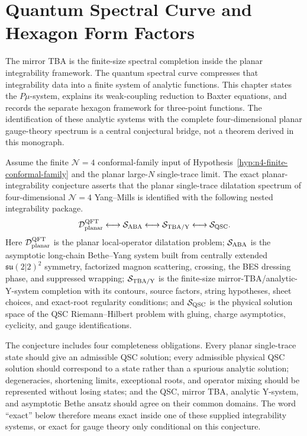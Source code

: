 \chapter{Quantum Spectral Curve and Hexagon Form Factors}
\label{ch:planar-n4-quantum-spectral-curve-hexagon}

\ConventionsLorentzian

The mirror TBA is the finite-size spectral completion inside the planar
integrability framework.  The quantum spectral curve compresses that
integrability data into a finite system of analytic functions.  This chapter
states the \(P\mu\)-system, explains its weak-coupling reduction to Baxter
equations, and records the separate hexagon framework for three-point
functions.  The identification of these analytic systems with the complete
four-dimensional planar gauge-theory spectrum is a central conjectural bridge,
not a theorem derived in this monograph.

\begin{conjecture}[Central conjecture: exact planar \(\mathcal N=4\) integrability]
\label{conj:planar-n4-exact-integrability}
Assume the finite \(\mathcal N=4\) conformal-family input of
Hypothesis~\ref{hyp:n4-finite-conformal-family} and the planar large-\(N\)
single-trace limit.  The exact planar-integrability conjecture asserts that
the planar single-trace dilatation spectrum of four-dimensional
\(\mathcal N=4\) Yang--Mills is identified with the following nested
integrability package.
\[
  \mathcal D_{\rm planar}^{\rm QFT}
  \longleftrightarrow
  \mathcal S_{\rm ABA}
  \longleftrightarrow
  \mathcal S_{\rm TBA/Y}
  \longleftrightarrow
  \mathcal S_{\rm QSC}.
\]
Here \(\mathcal D_{\rm planar}^{\rm QFT}\) is the planar local-operator
dilatation problem; \(\mathcal S_{\rm ABA}\) is the asymptotic long-chain
Bethe--Yang system built from centrally extended
\(\mathfrak{su}(2|2)^2\) symmetry, factorized magnon scattering, crossing,
the BES dressing phase, and suppressed wrapping; \(\mathcal S_{\rm TBA/Y}\)
is the finite-size mirror-TBA/analytic-Y-system completion with its contours,
source factors, string hypotheses, sheet choices, and exact-root regularity
conditions; and \(\mathcal S_{\rm QSC}\) is the physical solution space of the
QSC Riemann--Hilbert problem with gluing, charge asymptotics, cyclicity, and
gauge identifications.

The conjecture includes four completeness obligations.  Every planar
single-trace state should give an admissible QSC solution; every admissible
physical QSC solution should correspond to a state rather than a spurious
analytic solution; degeneracies, shortening limits, exceptional roots, and
operator mixing should be represented without losing states; and the QSC,
mirror TBA, analytic Y-system, and asymptotic Bethe ansatz should agree on
their common domains.  The word ``exact'' below therefore means exact inside
one of these supplied integrability systems, or exact for gauge theory only
conditional on this conjecture.
\end{conjecture}

